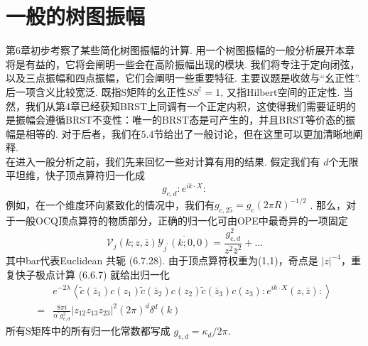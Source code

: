 \section{一般的树图振幅}
第6章初步考察了某些简化树图振幅的计算. 用一个树图振幅的一般分析展开本章将是有益的，它将会阐明一些会在高阶振幅出现的模块. 我们将专注于定向闭弦，以及三点振幅和四点振幅，它们会阐明一些重要特征. 主要议题是收敛与“幺正性”. 后一项含义比较宽泛. 既指S矩阵的幺正性$S S^{\dagger}=1$, 又指Hilbert空间的正定性. 当然，我们从第4章已经获知BRST上同调有一个正定内积，这使得我们需要证明的是振幅会遵循BRST不变性：唯一的BRST态是可产生的，并且BRST等价态的振幅是相等的. 对于后者，我们在5.4节给出了一般讨论，但在这里可以更加清晰地阐释.\\
在进入一般分析之前，我们先来回忆一些对计算有用的结果. 假定我们有 $d$个无限平坦维，快子顶点算符归一化成
\begin{equation}
	g_{\mathrm{c}, d}: e^{i k \cdot X}:
\end{equation}
例如，在一个维度环向紧致化的情况中，我们有$g_{\mathrm{c}, 25}=g_{\mathrm{c}}(2 \pi R)^{-1 / 2}$ .  那么，对于一般OCQ顶点算符的物质部分，正确的归一化可由OPE中最奇异的一项固定
\begin{equation}
	\mathscr{V}_{j}(k ; z, \bar{z}) \overline{\mathscr{Y}_{j^{\prime}}(k ; 0,0)}=\frac{g_{\mathrm{c}, d}^{2}}{z^{2} \bar{z}^{2}}+\ldots
\end{equation}
其中bar代表Euclidean 共轭 (6.7.28). 由于顶点算符权重为(1,1)，奇点是 $|z|^{-4}$，重复快子极点计算 (6.6.7) 就给出归一化
\begin{equation}
	\begin{aligned}
		&e^{-2 \lambda}\left\langle\tilde{c}\left(\bar{z}_{1}\right) c\left(z_{1}\right) \tilde{c}\left(\bar{z}_{2}\right) c\left(z_{2}\right) \tilde{c}\left(\bar{z}_{3}\right) c\left(z_{3}\right): e^{i k \cdot X}(z, \bar{z}):\right\rangle \\
		=&\frac{8 \pi i}{\alpha^{\prime} g_{c, d}^{2}}\left|z_{12} z_{13} z_{23}\right|^{2}(2 \pi)^{d} \delta^{d}(k)
	\end{aligned}
\end{equation}
所有S矩阵中的所有归一化常数都写成 $g_{\mathrm{c}, d}=\kappa_{d} / 2 \pi$.

